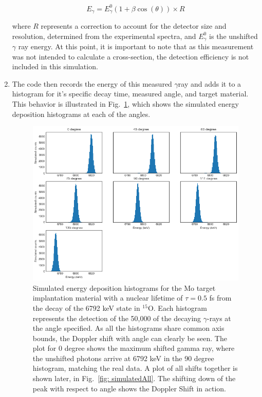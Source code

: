 \begin{enumerate}
\begin{equation}
E_{\gamma} = E_{\gamma}^{0} ( 1 + \beta \cos (\theta)) \times R
\label{eqn: doppSim}
\end{equation}

\noindent where $R$ represents a correction to account for the detector size and resolution, determined from the experimental spectra, and $E_{\gamma}^{0}$ is the unshifted $\gamma$ ray energy. At this point, it is important to note that as this measurement was not intended to calculate a cross-section, the detection efficiency is not included in this simulation. 
\item The code then records the energy of this measured $\gamma$ray and adds it to a histogram for it's specific decay time, measured angle, and target material. This behavior is illustrated in Fig.\ \ref{fig: simulatedSingle}, which shows the simulated energy deposition histograms at each of the angles.

\begin{figure}
\centering
\includegraphics[width=\linewidth]{figures/simulatedSingle.png}
\caption{Simulated energy deposition histograms for the Mo target implantation material with a nuclear lifetime of $\tau=0.5$ fs from the decay of the 6792 keV state in $^{15}$O. Each histogram represents the detection of the 50,000 of the decaying $\gamma$-rays at the angle specified. As all the histograms share common axis bounds, the Doppler shift with angle can clearly be seen. The plot for 0 degree shows the maximum shifted gamma ray, where the unshifted photons arrive at 6792 keV in the 90 degree histogram, matching the real data. A plot of all shifts together is shown later, in Fig.\ \ref{fig: simulatedAll}. The shifting down of the peak with respect to angle shows the Doppler Shift in action.}
\label{fig: simulatedSingle}
\end{figure}


\end{enumerate}
